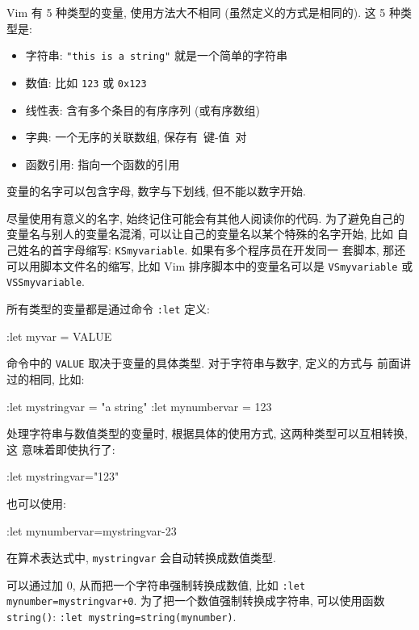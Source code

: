 Vim 有 5 种类型的变量, 使用方法大不相同 (虽然定义的方式是相同的). 这 5 种类
型是:
\begin{itemize}
    \item 字符串: \texttt{"this is a string"} 就是一个简单的字符串
    \item 数值: 比如 \texttt{123} 或 \texttt{0x123}
    \item 线性表: 含有多个条目的有序序列 (或有序数组)
    \item 字典: 一个无序的关联数组, 保存有\ 键-值\ 对
    \item 函数引用: 指向一个函数的引用
\end{itemize}

变量的名字可以包含字母, 数字与下划线, 但不能以数字开始.

\begin{warning}
    尽量使用有意义的名字, 始终记住可能会有其他人阅读你的代码. 为了避免自己的
    变量名与别人的变量名混淆, 可以让自己的变量名以某个特殊的名字开始, 比如
    自己姓名的首字母缩写: \texttt{KSmyvariable}. 如果有多个程序员在开发同一
    套脚本, 那还可以用脚本文件名的缩写, 比如 Vim 排序脚本中的变量名可以是
    \texttt{VSmyvariable} 或 \texttt{VSSmyvariable}.
\end{warning}

所有类型的变量都是通过命令 \texttt{:let} 定义:
\begin{vimcode}
:let myvar = VALUE
\end{vimcode}
命令中的 \texttt{VALUE} 取决于变量的具体类型. 对于字符串与数字, 定义的方式与
前面讲过的相同, 比如:
\begin{vimcode}
:let mystringvar = "a string"
:let mynumbervar = 123
\end{vimcode}
处理字符串与数值类型的变量时, 根据具体的使用方式, 这两种类型可以互相转换, 这
意味着即使执行了:
\begin{vimcode}
:let mystringvar="123"
\end{vimcode}
也可以使用:
\begin{vimcode}
:let mynumbervar=mystringvar-23
\end{vimcode}
在算术表达式中, \texttt{mystringvar} 会自动转换成数值类型.
\begin{warning}
    可以通过加 0, 从而把一个字符串强制转换成数值, 比如 \texttt{:let
    mynumber=mystringvar+0}. 为了把一个数值强制转换成字符串, 可以使用函数
    \texttt{string()}: \texttt{:let mystring=string(mynumber)}.
\end{warning}

